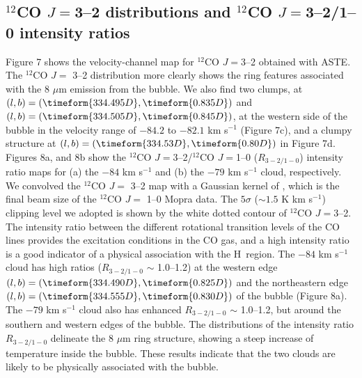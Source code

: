 \documentclass[onecolumn]{pasj01}
\begin{document}
{{{{{\subsection{{$^{12}$CO $J=$3--2 distributions and {$^{12}$CO $J=$3--2/1--0 intensity ratios}}}
{{Figure 7} {shows} the velocity-channel map {for} $^{12}$CO $J=$3--2 obtained {with} ASTE. 
The $^{12}$CO $J=$ 3--2 distribution {more clearly} shows  {the} ring features associated with the 8 $\mu$m emission {from} the bubble.
We also find two clumps, at $(l,b)=(\timeform{334.495D}, \timeform{0.835D})$ and $(l,b)=(\timeform{334.505D}, \timeform{0.845D})$, at the western side of the bubble {{in} the velocity range of $-84.2$ {to} $-82.1$ km s$^{-1}$ ({Figure 7c})}, and {a} clumpy structure at $(l,b)=(\timeform{334.53D}, \timeform{0.80D})$ in {Figure 7d}.}
{Figures 8a, and 8b} show the $^{12}$CO $J=$3--2/$^{12}$CO $J=$1--0 ($R_{3-2/1-0}$) intensity ratio maps {for} (a) the {$-84$ km s$^{-1}$ and (b) the $-79$ km s$^{-1}$ cloud}, respectively.
We convolved {the $^{12}$CO $J =$ 3--2 {map} with {a} Gaussian kernel of , which is the final beam size of the $^{12}$CO $J =$ 1--0 Mopra data. }
{The $5\sigma$ ({$\sim1.5$ K km s$^{-1}$}) clipping level{ we adopted is shown by the white dotted contour of $^{12}$CO $J=$3--2}.}
{The intensity ratio between the different rotational transition levels of {the} CO lines provide{s} the excitation condition{s in} the CO gas, and {a} high intensity ratio is a good indicator of {a} physical association with the H\, region.}
{The $-84$ km s$^{-1}$ cloud has high {ratios} ($R_{3-2/1-0}$ $\sim$ 1.0--1.2) at the western {edge}
 $(l,b)=(\timeform{334.490D}, \timeform{0.825D})$ and {the} northeastern edge $(l,b)=(\timeform{334.555D}, \timeform{0.830D})$ of the bubble ({Figure 8a}).}
{The $-79$ km s$^{-1}$ cloud also {has} enhanced $R_{3-2/1-0}$ $\sim$ 1.0--1.2{, but} around the southern and western edge{s} of the bubble. 
The distributions of the intensity ratio $R_{3-2/1-0}$ delineate the 8 $\mu$m ring structure, showing {a} steep increase of temperature {inside} the bubble. These results indicate that the two clouds are likely to be {physically} associated with the bubble.}


}}}}}
\end{document}
